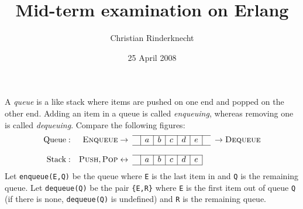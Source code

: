 \documentclass[11pt,a4paper]{article}
\title{Mid-term examination on Erlang}
\author{Christian Rinderknecht}
\date{25 April 2008}
\begin{document}
\maketitle

\thispagestyle{empty}

\noindent A \emph{queue} is a like stack where items are pushed on one
end and popped on the other end. Adding an item in a queue is called
\emph{enqueuing}, whereas removing one is called
\emph{dequeuing}. Compare the following figures:
\[
\begin{array}{rr@{\;}cc|c|c|c|c|c|cc@{\;}l}
\cline{4-10}
\text{Queue}: & \textsc{Enqueue} & \rightarrow & & a & b & c & d & e &
& \rightarrow & \textsc{Dequeue}\\
\cline{4-10}\\
\cline{4-9}
\text{Stack}: & \textsc{Push}, \textsc{Pop} & \leftrightarrow & & a &
b & c & d & e &&&\\
\cline{4-9}
\end{array}
\]
\noindent Let \texttt{enqueue(E,Q)} be the queue where \texttt{E} is
the last item in and \texttt{Q} is the remaining queue. Let
\texttt{dequeue(Q)} be the pair \texttt{\{E,R\}} where \texttt{E} is
the first item out of queue \texttt{Q} (if there is none,
\texttt{dequeue(Q)} is undefined) and \texttt{R} is the remaining
queue.

\bigskip



\end{document}
